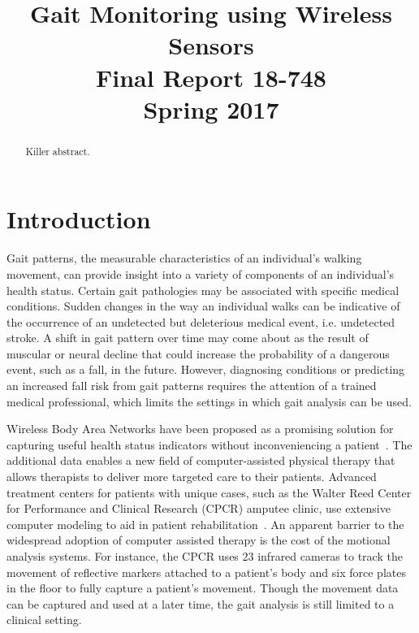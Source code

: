 \documentclass[conference]{IEEEtran}
\author{
  \IEEEauthorblockN{
   Iljoo Baek, Mengwen He and Emily Ruppel
  }
 \IEEEauthorblockA{
   Carnegie Mellon University
  }
 \IEEEauthorblockA{
   {ibaek,mengwenhe,eruppel}@andrew.cmu.edu
  }
}
\title{Gait Monitoring using Wireless Sensors\\
        \vspace{4mm}
        \large{Final Report 18-748}\\
        \large{Spring 2017}}
\begin{document}
\maketitle

\begin{abstract}
Killer abstract. 
\end{abstract}

\section{Introduction}
  \label{sec:intro}
  Gait patterns, the measurable characteristics of an individual’s walking movement, can
provide insight into a variety of components of an individual’s health status. Certain
gait pathologies may be associated with specific medical conditions. Sudden changes in the
way an individual walks can be indicative of the occurrence of an undetected but
deleterious medical event, i.e. undetected stroke. A shift in gait pattern over time may
come about as the result of muscular or neural decline that could increase the probability
of a dangerous event, such as a fall, in the future. However, diagnosing conditions or
predicting an increased fall risk from gait patterns requires the attention of a trained
medical professional, which limits the settings in which gait analysis can be used.
    
Wireless Body Area Networks have been proposed as a promising solution for capturing
useful health status indicators without inconveniencing a patient~\cite{wban}. The
additional data enables a new field of computer-assisted physical therapy that allows
therapists to deliver more targeted care to their patients. Advanced treatment centers for
patients with unique cases, such as the Walter Reed Center for Performance and Clinical
Research (CPCR) amputee clinic, use extensive computer modeling to aid in patient
rehabilitation~\cite{cpcr}.  An apparent barrier to the widespread adoption of computer
assisted therapy is the cost of the motional analysis systems. For instance, the CPCR uses
23 infrared cameras to track the movement of reflective markers attached to a patient's
body and six force plates in the floor to fully capture a patient's movement. Though the
movement data can be captured and used at a later time, the gait analysis is still limited
to a clinical setting. 
  
\end{document}
